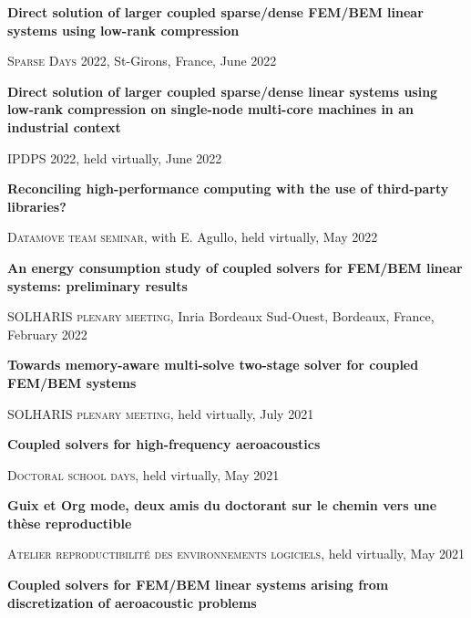 \documentclass[a4paper, 11pt]{article}
\begin{document}
\vspace{.7em}

\textbf{Direct solution of larger coupled sparse/dense FEM/BEM linear systems
using low-rank compression}

\textsc{Sparse Days 2022}, St-Girons, France, June 2022

\vspace{.7em}

\textbf{Direct solution of larger coupled sparse/dense linear systems using
low-rank compression on single-node multi-core machines in an industrial
context}

\textsc{IPDPS 2022}, held virtually, June 2022

\vspace{.7em}

\textbf{Reconciling high-performance computing with the use of third-party
libraries?}

\textsc{Datamove team seminar}, with E. Agullo, held virtually, May 2022

\vspace{.7em}

\textbf{An energy consumption study of coupled solvers for FEM/BEM linear
systems: preliminary results}

\textsc{SOLHARIS plenary meeting}, Inria Bordeaux Sud-Ouest, Bordeaux, France,
February 2022

\vspace{.7em}

\textbf{Towards memory-aware multi-solve two-stage solver for coupled FEM/BEM
systems}

\textsc{SOLHARIS plenary meeting}, held virtually, July 2021

\vspace{.7em}

\textbf{Coupled solvers for high-frequency aeroacoustics}

\textsc{Doctoral school days}, held virtually, May 2021

\vspace{.7em}

\textbf{Guix et Org mode, deux amis du doctorant sur le chemin vers une thèse
reproductible}

\textsc{Atelier reproductibilité des environnements logiciels}, held virtually,
May 2021

\vspace{.7em}

\textbf{Coupled solvers for FEM/BEM linear systems arising from discretization
of aeroacoustic problems}
\end{document}
